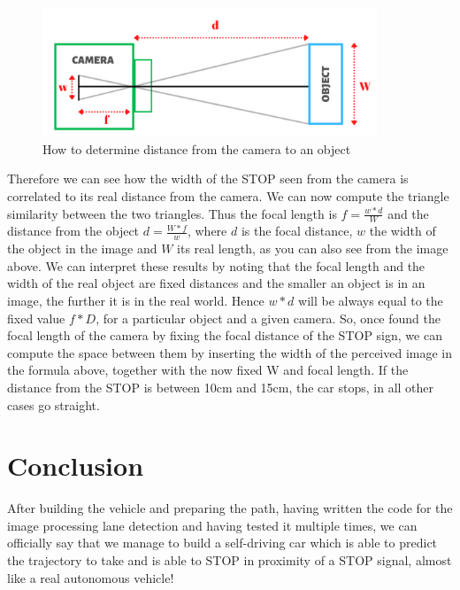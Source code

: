 \documentclass[12pt,a4paper]{article}
\begin{document}
\begin{large}
\begin{figure} [!h]
  \centering
  \captionsetup{justification=centering}
  \includegraphics[width=10cm]{images/3D_distance.png}
  \caption{How to determine distance from the camera to an object}
  \end{figure}

Therefore we can see how the width of the STOP seen from the camera is correlated to its real distance from the camera. We can now compute the triangle similarity between the two triangles. Thus the focal length is $f = \frac{w * d}{W}$ and the distance from the object $d = \frac{W * f}{w}$, where $d$ is the focal distance, $w$ the width of the object in the image and $W$ its real length, as you can also see from the image above. We can interpret these results by noting that the focal length and the width of the real object are fixed distances and the smaller an object is in an image, the further it is in the real world. Hence $w*d$ will be always equal to the fixed value $f*D$, for a particular object and a given camera.
So, once found the focal length of the camera by fixing the focal distance of the STOP sign, we can compute the space between them by inserting the width of the perceived image in the formula above, together with the now fixed W and focal length. If the distance from the STOP is between 10cm and 15cm, the car stops, in all other cases go straight.


\section{Conclusion}
After building the vehicle and preparing the path, having written the code for the image processing lane detection and having tested it multiple times,  we can officially say that we manage to build a self-driving car which is able to predict the trajectory to take and is able to STOP in proximity of a STOP signal, almost like a real autonomous vehicle! \\



\end{large}
\end{document}
